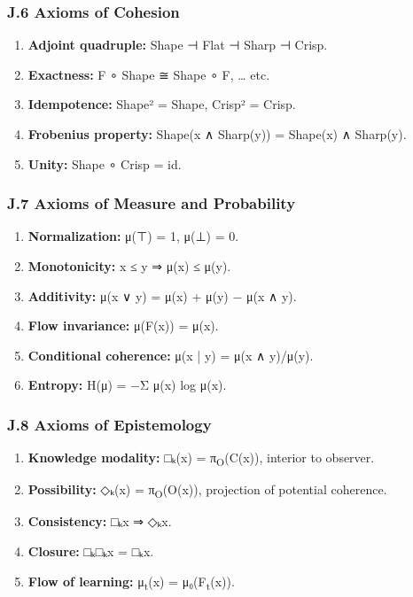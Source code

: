 \documentclass[11pt]{article}
\begin{document}
\subsubsection*{J.6 Axioms of Cohesion}
\label{sec:org387a7ab}
\begin{enumerate}
\item \textbf{\textbf{Adjoint quadruple:}} Shape ⊣ Flat ⊣ Sharp ⊣ Crisp.
\item \textbf{\textbf{Exactness:}} F ∘ Shape ≅ Shape ∘ F, … etc.
\item \textbf{\textbf{Idempotence:}} Shape² = Shape, Crisp² = Crisp.
\item \textbf{\textbf{Frobenius property:}} Shape(x ∧ Sharp(y)) = Shape(x) ∧ Sharp(y).
\item \textbf{\textbf{Unity:}} Shape ∘ Crisp = id.
\end{enumerate}
\subsubsection*{J.7 Axioms of Measure and Probability}
\label{sec:org0ee40ec}
\begin{enumerate}
\item \textbf{\textbf{Normalization:}} μ(⊤) = 1, μ(⊥) = 0.
\item \textbf{\textbf{Monotonicity:}} x ≤ y ⇒ μ(x) ≤ μ(y).
\item \textbf{\textbf{Additivity:}} μ(x ∨ y) = μ(x) + μ(y) − μ(x ∧ y).
\item \textbf{\textbf{Flow invariance:}} μ(F(x)) = μ(x).
\item \textbf{\textbf{Conditional coherence:}} μ(x | y) = μ(x ∧ y)/μ(y).
\item \textbf{\textbf{Entropy:}} H(μ) = −Σ μ(x) log μ(x).
\end{enumerate}
\subsubsection*{J.8 Axioms of Epistemology}
\label{sec:orgdb339d6}
\begin{enumerate}
\item \textbf{\textbf{Knowledge modality:}} □ₖ(x) = π\textsubscript{O}(C(x)), interior to observer.
\item \textbf{\textbf{Possibility:}} ◇ₖ(x) = π\textsubscript{O}(O(x)), projection of potential coherence.
\item \textbf{\textbf{Consistency:}} □ₖx ⇒ ◇ₖx.
\item \textbf{\textbf{Closure:}} □ₖ□ₖx = □ₖx.
\item \textbf{\textbf{Flow of learning:}} μ\textsubscript{t}(x) = μ₀(F\textsubscript{t}(x)).
\end{enumerate}
\end{document}
